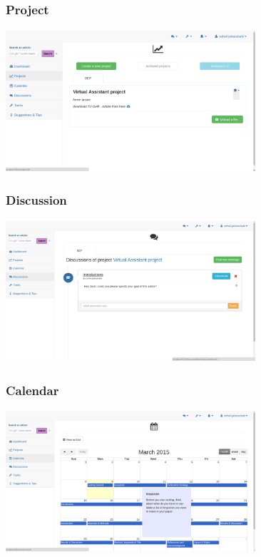 \subsubsection{Project}

\begin{center}
\includegraphics[height=200px, width=350px]{./img/dsgn_img/project.png}
	
\end{center}
\subsubsection{Discussion}

\begin{center}
\includegraphics[height=200px, width=350px]{./img/dsgn_img/discussion.png}
	
\end{center}

\subsubsection{Calendar}

\begin{center}
\includegraphics[height=200px, width=350px]{./img/dsgn_img/calendar.png}
	
\end{center}

